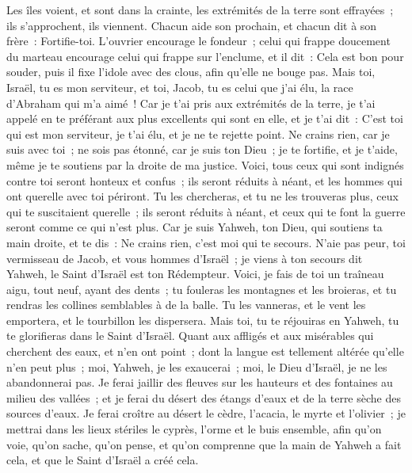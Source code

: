 \begin{multicols}{2}
Les îles voient, et sont dans la crainte, les extrémités de la terre sont effrayées~; ils s'approchent, ils viennent.
Chacun aide son prochain, et chacun dit à son frère~: Fortifie-toi.
L'ouvrier encourage le fondeur~; celui qui frappe doucement du marteau encourage celui qui frappe sur l'enclume, et il dit~: Cela est bon pour souder, puis il fixe l'idole avec des clous, afin qu'elle ne bouge pas.
Mais toi, Israël, tu es mon serviteur, et toi, Jacob, tu es celui que j'ai élu, la race d'Abraham qui m'a aimé~!
Car je t'ai pris aux extrémités de la terre, je t'ai appelé en te préférant aux plus excellents qui sont en elle, et je t'ai dit~: C'est toi qui est mon serviteur, je t'ai élu, et je ne te rejette point.
Ne crains rien, car je suis avec toi~; ne sois pas étonné, car je suis ton Dieu~; je te fortifie, et je t'aide, même je te soutiens par la droite de ma justice.
Voici, tous ceux qui sont indignés contre toi seront honteux et confus~; ils seront réduits à néant, et les hommes qui ont querelle avec toi périront.
Tu les chercheras, et tu ne les trouveras plus, ceux qui te suscitaient querelle~; ils seront réduits à néant, et ceux qui te font la guerre seront comme ce qui n'est plus.
Car je suis Yahweh, ton Dieu, qui soutiens ta main droite, et te dis~: Ne crains rien, c'est moi qui te secours.
N’aie pas peur, toi vermisseau de Jacob, et vous hommes d’Israël~; je viens à ton secours dit Yahweh, le Saint d'Israël est ton Rédempteur.
Voici, je fais de toi un traîneau aigu, tout neuf, ayant des dents~; tu fouleras les montagnes et les broieras, et tu rendras les collines semblables à de la balle.
Tu les vanneras, et le vent les emportera, et le tourbillon les dispersera. Mais toi, tu te réjouiras en Yahweh, tu te glorifieras dans le Saint d'Israël.
Quant aux affligés et aux misérables qui cherchent des eaux, et n'en ont point~; dont la langue est tellement altérée qu'elle n'en peut plus~; moi, Yahweh, je les exaucerai~; moi, le Dieu d'Israël, je ne les abandonnerai pas.
Je ferai jaillir des fleuves sur les hauteurs et des fontaines au milieu des vallées~; et je ferai du désert des étangs d'eaux et de la terre sèche des sources d'eaux.
Je ferai croître au désert le cèdre, l'acacia, le myrte et l'olivier~; je mettrai dans les lieux stériles le cyprès, l'orme et le buis ensemble,
afin qu'on voie, qu'on sache, qu'on pense, et qu'on comprenne que la main de Yahweh a fait cela, et que le Saint d'Israël a créé cela.

\end{multicols}
